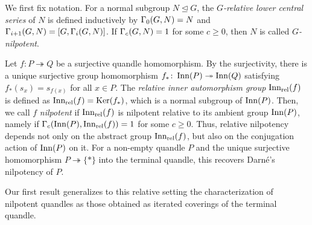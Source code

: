 We first fix notation. For a normal subgroup $N \trianglelefteq G$, the \emph{$G$-relative lower central series} of $N$ is defined inductively by $\Gamma_0(G,N)=N$ and $\Gamma_{i+1}(G,N)=[G,\Gamma_i(G,N)]$. If $\Gamma_c(G,N)=1$ for some $c\geq 0$, then $N$ is called \emph{$G$-nilpotent}.


Let $f \colon P\twoheadrightarrow Q$ be a surjective quandle homomorphism.
By the surjectivity, there is a unique surjective group homomorphism $f_*\colon \operatorname{Inn}(P)\twoheadrightarrow \operatorname{Inn}(Q)$ satisfying $f_*(s_x)=s_{f(x)}$ for all $x\in P$.
The \emph{relative inner automorphism group} $\operatorname{Inn_{rel}}(f)$ is defined as $\operatorname{Inn_{rel}}(f)=\operatorname{Ker}(f_*)$, which is a normal subgroup of $\operatorname{Inn}(P)$.
Then, we call $f$ \emph{nilpotent} if $\operatorname{Inn_{rel}}(f)$ is nilpotent relative to its ambient group $\operatorname{Inn}(P)$, namely if $\Gamma_{c}(\operatorname{Inn}(P),\operatorname{Inn_{rel}}(f))=1$ for some $c\geq0$. Thus, relative nilpotency depends not only on the abstract group $\operatorname{Inn_{rel}}(f)$, but also on the conjugation action of $\operatorname{Inn}(P)$ on it.
For a non-empty quandle $P$ and the unique surjective homomorphism $P\twoheadrightarrow\{\ast\}$ into the terminal quandle, this recovers Darn\'e's nilpotency of $P$.

Our first result generalizes to this relative setting the characterization of nilpotent quandles as those obtained as iterated coverings of the terminal quandle.


